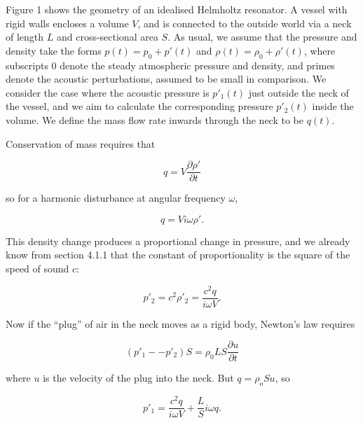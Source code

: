   Figure 1 shows the geometry of an idealised Helmholtz resonator. A vessel 
  with rigid walls encloses a volume $V$, and is connected to the outside world 
  via a neck of length $L$ and cross-sectional area $S$. As usual, we assume 
  that the pressure and density take the forms $p(t)=p_0+p'(t)$ and 
  $\rho(t)=\rho_0+\rho'(t)$, where subscripts 0 denote the steady atmospheric 
  pressure and density, and primes denote the acoustic perturbations, assumed 
  to be small in comparison. We consider the case where the acoustic pressure 
  is $p'_1(t)$ just outside the neck of the vessel, and we aim to calculate the 
  corresponding pressure $p'_2(t)$ inside the volume. We define the mass flow 
  rate inwards through the neck to be $q(t)$. 


  Conservation of mass requires that 

  \begin{equation*}q=V\dfrac{\partial \rho'}{\partial t} \tag{1}\end{equation*} 

  \noindent{}so for a harmonic disturbance at angular frequency $\omega$, 

  \begin{equation*}q=V i \omega \rho' . \tag{2}\end{equation*} 

  This density change produces a proportional change in pressure, and we 
  already know from section 4.1.1 that the constant of proportionality is the 
  square of the speed of sound $c$: 

  \begin{equation*}p'_2=c^2 \rho'_2 = \dfrac{c^2 q}{i \omega V} . 
  \tag{3}\end{equation*} 

  Now if the ``plug'' of air in the neck moves as a rigid body, Newton's law 
  requires 

  \begin{equation*}\left( p'_1 -- p'_2 \right) S = \rho_0 L S \dfrac{\partial 
  u}{\partial t} \tag{4}\end{equation*} 

  \noindent{}where $u$ is the velocity of the plug into the neck. But $q=\rho_o 
  S u$, so 

  \begin{equation*}p'_1 = \dfrac{c^2 q}{i \omega V} + \dfrac{L}{S} i \omega q . 
  \tag{5}\end{equation*} 

